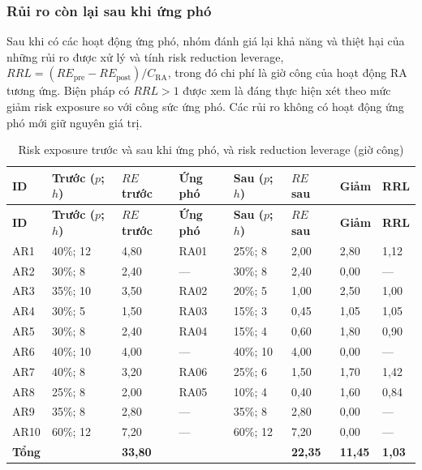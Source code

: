 \subsubsection{Rủi ro còn lại sau khi ứng phó}

Sau khi có các hoạt động ứng phó, nhóm đánh giá lại khả năng và thiệt hại của những rủi ro được xử lý và tính risk reduction leverage, $RRL = (RE_{\mathrm{pre}} - RE_{\mathrm{post}}) / C_{\mathrm{RA}}$, trong đó chi phí là giờ công của hoạt động RA tương ứng. Biện pháp có $RRL > 1$ được xem là đáng thực hiện xét theo mức giảm risk exposure so với công sức ứng phó. Các rủi ro không có hoạt động ứng phó mới giữ nguyên giá trị.

{\small
\begin{longtable}{@{}Y{1.0cm}Y{1.9cm}Y{1.3cm}Y{1.5cm}Y{1.9cm}Y{1.3cm}Y{1.3cm}Y{1.3cm}@{}}
\caption{Risk exposure trước và sau khi ứng phó, và risk reduction leverage (giờ công)}
\label{tab:p29-residual}\\
\toprule
\textbf{ID} &
\textbf{Trước ($p$; $h$)} &
\textbf{$RE$ trước} &
\textbf{Ứng phó} &
\textbf{Sau ($p$; $h$)} &
\textbf{$RE$ sau} &
\textbf{Giảm} &
\textbf{RRL} \\
\midrule
\endfirsthead

\toprule
\textbf{ID} &
\textbf{Trước ($p$; $h$)} &
\textbf{$RE$ trước} &
\textbf{Ứng phó} &
\textbf{Sau ($p$; $h$)} &
\textbf{$RE$ sau} &
\textbf{Giảm} &
\textbf{RRL} \\
\midrule
\endhead

\bottomrule
\endfoot

AR1 & 40\%; 12 & 4,80 & RA01 & 25\%; 8 & 2,00 & 2,80 & 1,12 \\

AR2 & 30\%; 8 & 2,40 & --- & 30\%; 8 & 2,40 & 0,00 & --- \\

AR3 & 35\%; 10 & 3,50 & RA02 & 20\%; 5 & 1,00 & 2,50 & 1,00 \\

AR4 & 30\%; 5 & 1,50 & RA03 & 15\%; 3 & 0,45 & 1,05 & 1,05 \\

AR5 & 30\%; 8 & 2,40 & RA04 & 15\%; 4 & 0,60 & 1,80 & 0,90 \\

AR6 & 40\%; 10 & 4,00 & --- & 40\%; 10 & 4,00 & 0,00 & --- \\

AR7 & 40\%; 8 & 3,20 & RA06 & 25\%; 6 & 1,50 & 1,70 & 1,42 \\

AR8 & 25\%; 8 & 2,00 & RA05 & 10\%; 4 & 0,40 & 1,60 & 0,84 \\

AR9 & 35\%; 8 & 2,80 & --- & 35\%; 8 & 2,80 & 0,00 & --- \\

AR10 & 60\%; 12 & 7,20 & --- & 60\%; 12 & 7,20 & 0,00 & --- \\

\midrule
\textbf{Tổng} &
&
\textbf{33,80} &
&
&
\textbf{22,35} &
\textbf{11,45} &
\textbf{1,03} \\

\end{longtable}
}

